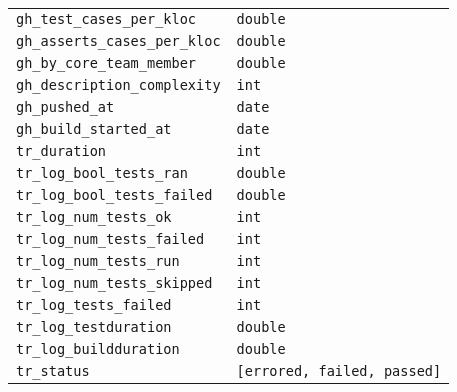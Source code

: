 \begin{table}[H]
\begin{tabularx}{\textwidth}{ l X }
		\texttt{gh\_test\_cases\_per\_kloc} &              \texttt{double} \\ 
		\texttt{gh\_asserts\_cases\_per\_kloc} &           \texttt{double} \\ 
		\texttt{gh\_by\_core\_team\_member} &              \texttt{double} \\ 
		\texttt{gh\_description\_complexity} &           \texttt{int} \\ 
		\texttt{gh\_pushed\_at} &                        \texttt{date} \\ 
		\texttt{gh\_build\_started\_at} &                 \texttt{date} \\ 
		\texttt{tr\_duration} &                         \texttt{int} \\ 
		\texttt{tr\_log\_bool\_tests\_ran} &               \texttt{double} \\ 
		\texttt{tr\_log\_bool\_tests\_failed} &            \texttt{double} \\ 
		\texttt{tr\_log\_num\_tests\_ok} &                 \texttt{int} \\ 
		\texttt{tr\_log\_num\_tests\_failed} &             \texttt{int} \\ 
		\texttt{tr\_log\_num\_tests\_run} &                \texttt{int} \\ 
		\texttt{tr\_log\_num\_tests\_skipped} &            \texttt{int} \\ 
		\texttt{tr\_log\_tests\_failed} &                 \texttt{int} \\ 
		\texttt{tr\_log\_testduration} &                 \texttt{double} \\ 
		\texttt{tr\_log\_buildduration} &                \texttt{double} \\ 
		\texttt{tr\_status} &                           \texttt{[errored, failed, passed]}
	\end{tabularx}
\end{table}

